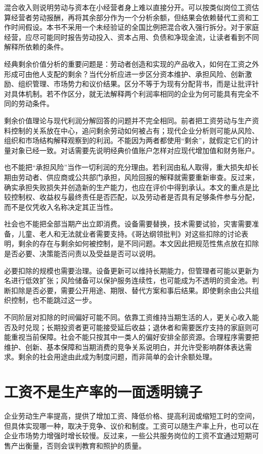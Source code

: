\documentclass[UTF8,fontset=fandol,zihao=-4,oneside,openany]{ctexbook}
\begin{document}
混合收入则说明劳动与资本在小经营者身上难以直接分开。可以按类似岗位工资估算经营者劳动报酬，再将其余部分作为一个分析余额，但结果会依赖替代工资和工作时间假设。本书不采用一个未经验证的全国比例把混合收入强行拆分。对于家庭经营，应尽可能同时报告劳动投入、资本占用、负债和净现金流，让读者看到不同解释所依赖的条件。

经典剩余价值分析的重要问题是：劳动者创造和实现的产品收入，如何在工资之外形成可由他人支配的剩余？当代分析应进一步区分资本维护、承担风险、创新激励、组织管理、市场势力和议价结果。区分不等于为现有分配背书，而是让批评针对具体机制。若不作区分，就无法解释两个利润率相同的企业为何可能具有完全不同的劳动条件。

\label{arg:P061}
剩余价值理论与现代利润分解回答的问题并不完全相同。前者把工资劳动与生产资料控制的关系放在中心，追问剩余劳动如何被占有；现代企业分析则可能从风险、组织和市场结构解释观察到的利润。不能因为两者都使用“剩余”，就假定它们的计量对象已经一致。对话需要先说明经典价值账户怎样对应现代增加值和财务账户。

也不能把“承担风险”当作一切利润的充分理由。若利润由私人取得，重大损失却长期由劳动者、供应商或公共部门承担，风险回报的解释就需要重新审查。反过来，确实承担失败损失并创造新的生产能力，也应在评价中得到承认。本文的重点是比较控制权、收益权与最终责任是否匹配，以及劳动者是否具有足够条件参与分配，而不是仅凭收入名称决定其正当性。

社会也不能把全部当期产出立即消费。设备需要替换，技术需要试验，灾害需要准备，儿童、老人和无法就业者需要支持。《哥达纲领批判》对这些扣除的讨论表明，剩余的存在与剩余如何被控制，是不同问题。本文因此把规范性焦点放在扣除是否必要、决策能否问责以及受益是否可以说明。\cite{Gotha}

\label{arg:P062}
必要扣除的规模也需要治理。设备更新可以维持长期能力，但管理者可能以更新为名进行低效扩张；风险储备可以保护服务连续性，也可能成为不透明的资金池。判断扣除是否必要，需要公开用途、期限、替代方案和事后结果。即使剩余由公共组织控制，也不能跳过这一步。

不同阶层对扣除的时间偏好可能不同。依靠工资维持当期生活的人，更关心收入能否及时兑现；长期投资者更可能接受延后收益；退休者和需要医疗支持的家庭则可能重视当前保障。社会不能只按其中一类人的偏好安排全部资源。合理程序需要把维护、创新、基本保障和当期消费的竞争关系说明白，并允许受影响群体表达需求。剩余的社会用途由此成为制度问题，而非简单的会计余额处理。

\section{工资不是生产率的一面透明镜子}
企业劳动生产率提高，提供了增加工资、降低价格、提高利润或缩短工时的空间，但具体实现哪一种，取决于竞争、议价和制度。工资可以随生产率上升，也可以在企业市场势力增强时增长较慢。反过来，一些公共服务岗位的工资不宜通过短期可售产出衡量，否则会误判教育和照护的质量。
\end{document}
